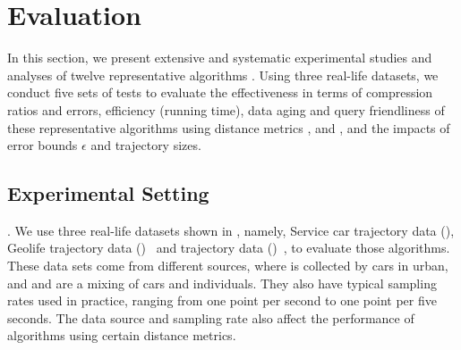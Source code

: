 \section{Evaluation} %
\label{sec-exp}
In this section, we present extensive and systematic experimental studies and analyses of twelve representative \lsa algorithms .
Using three real-life datasets, we conduct five sets of tests to evaluate the effectiveness in terms of compression ratios and errors, efficiency (running time), data aging and query friendliness of these representative algorithms using distance metrics \ped, \sed and \dad, and the impacts of error bounds $\epsilon$ and trajectory sizes.
%

\subsection{Experimental Setting}

.
We use three real-life datasets shown in , namely, Service car trajectory data (\ucar), Geolife trajectory data (\geolife)~\cite{Web:Geolife} and \mopsi trajectory data (\mopsi)~\cite{Web:Mopsi}, to evaluate those \lsa algorithms.
These data sets come from different sources, where \ucar is collected by cars in urban, and \geolife and \mopsi are a mixing of cars and individuals. They also have {typical sampling rates used in practice, ranging from one point per second to one point per five seconds.}
The data source and sampling rate also affect the performance of \lsa algorithms using certain distance metrics.


